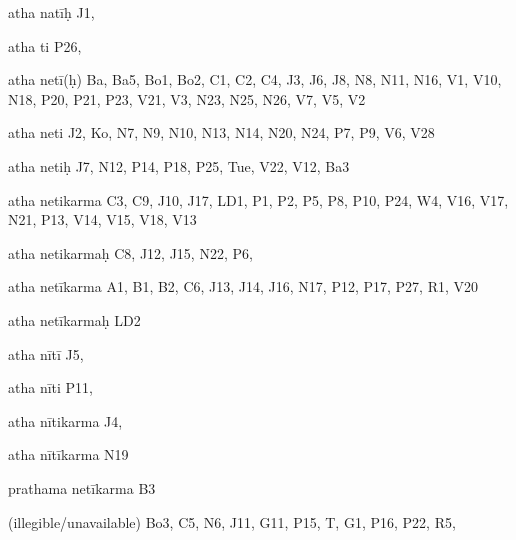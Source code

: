\begin{ekdosis}
\begin{marma}[hp01_055]
\begin{marma}[hp02_009]
\begin{marma}[hp02_011]
\begin{marma}[hp02_29d]
\begin{description}
    \end{description}
 \end{marma}

 \begin{marma}[hp02_30]
\item[atha natīḥ] J1,
\item[atha ti] P26, 
\item[atha netī(ḥ)] Ba, Ba5, Bo1, Bo2, C1, C2, C4, J3, J6, J8, N8, N11, N16, V1, V10, N18, P20, P21, P23, V21, V3, N23, N25, N26, V7, V5, V2
\item[atha neti] J2, Ko, N7, N9, N10, N13, N14, N20, N24, P7, P9, V6, V28
\item[atha netiḥ] J7, N12, P14, P18, P25, Tue, V22, V12, Ba3
\item[atha netikarma] C3, C9, J10, J17, LD1, P1, P2, P5, P8, P10, P24, W4, V16, V17, N21, P13, V14, V15, V18, V13
\item[atha netikarmaḥ] C8, J12, J15, N22, P6, 
\item[atha netīkarma] A1, B1, B2, C6, J13, J14, J16, N17, P12, P17, P27, R1, V20
\item[atha netīkarmaḥ] LD2
\item[atha nītī] J5,
\item[atha nīti] P11, 
\item[atha nītikarma] J4,
\item[atha nītīkarma] N19
\item[prathama netīkarma] B3
\item[(illegible/unavailable)] Bo3, C5, N6, J11, G11, P15, T, G1, P16, P22, R5,
  \begin{description}

    \end{description}
 \end{marma}


\end{marma}
\end{marma}
\end{marma}
\end{ekdosis}
